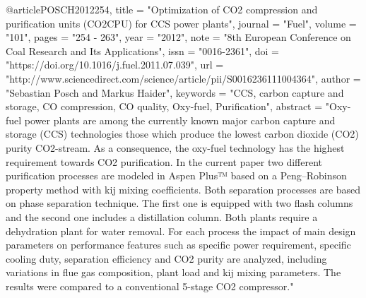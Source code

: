 @article{POSCH2012254,
	title = "Optimization of CO2 compression and purification units (CO2CPU) for CCS power plants",
	journal = "Fuel",
	volume = "101",
	pages = "254 - 263",
	year = "2012",
	note = "8th European Conference on Coal Research and Its Applications",
	issn = "0016-2361",
	doi = "https://doi.org/10.1016/j.fuel.2011.07.039",
	url = "http://www.sciencedirect.com/science/article/pii/S0016236111004364",
	author = "Sebastian Posch and Markus Haider",
	keywords = "CCS, carbon capture and storage, CO compression, CO quality, Oxy-fuel, Purification",
	abstract = "Oxy-fuel power plants are among the currently known major carbon capture and storage (CCS) technologies those which produce the lowest carbon dioxide (CO2) purity CO2-stream. As a consequence, the oxy-fuel technology has the highest requirement towards CO2 purification. In the current paper two different purification processes are modeled in Aspen Plus™ based on a Peng–Robinson property method with kij mixing coefficients. Both separation processes are based on phase separation technique. The first one is equipped with two flash columns and the second one includes a distillation column. Both plants require a dehydration plant for water removal. For each process the impact of main design parameters on performance features such as specific power requirement, specific cooling duty, separation efficiency and CO2 purity are analyzed, including variations in flue gas composition, plant load and kij mixing parameters. The results were compared to a conventional 5-stage CO2 compressor."
}


